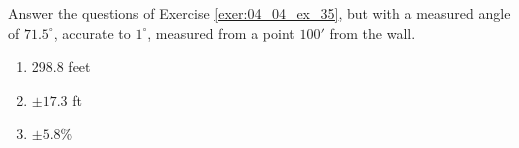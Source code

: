 {\label{exer:04_04_ex_36} Answer the questions of Exercise \ref{exer:04_04_ex_35}, but with a measured angle of $71.5^\circ$, accurate to $1^\circ$, measured from a point $100'$ from the wall.
%
}
{\begin{enumerate}
\item		298.8 feet
\item		$\pm 17.3$ ft
\item		$\pm 5.8$\% 
\end{enumerate}
}


